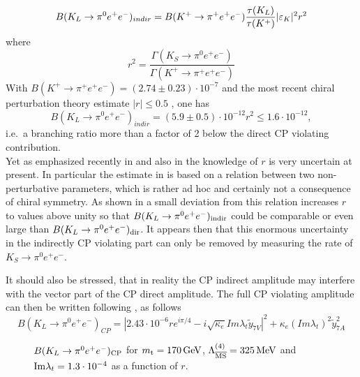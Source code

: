 \begin{equation}
B(K_L \to \pi^0 e^+ e^-)_{indir}=B(K^+ \to \pi^+e^+e^-)
\frac{\tau(K_L)}{\tau(K^+)} |\varepsilon_K|^2 r^2
\label{eq:BKLindir1}
\end{equation}
where
\begin{equation}
r^2=\frac{\Gamma(K_S \to \pi^0 e^+ e^-)}{\Gamma(K^+ \to \pi^+ e^+ e^-)}
\label{eq:r2}
\end{equation}
With $B(K^+ \to \pi^+e^+e^-)=(2.74\pm 0.23)\cdot 10^{-7}$
\cite{alliegro:92} and the most recent chiral perturbation theory
estimate $|r| \le 0.5 $ \cite{eckeretal:88}, \cite{brunoprades:93}
one has
\begin{equation}
B(K_L \to \pi^0 e^+ e^-)_{indir}=(5.9\pm 0.5)\cdot 10^{-12} r^2
 \le 1.6\cdot 10^{-12},
\label{eq:BKLindir2}
\end{equation}
i.e.\ a branching ratio more than a factor of 2 below the direct CP
violating contribution. \\
Yet as emphasized recently in \cite{donoghuegabbiani:95} and also in
\cite{heiligerseghal:93} the knowledge of $r$ is very uncertain at
present. In particular the estimate in  is based on
a relation between two non-perturbative parameters, which is rather
ad hoc and certainly not a consequence of chiral symmetry. As shown
in \cite{donoghuegabbiani:95} a small deviation from this relation
increases $r$ to values above unity so that $B(K_L \to \pi^0
e^+e^-)_{\rm indir}$ could be comparable or even large than 
$B(K_L \to \pi^0 e^+e^-)_{\rm dir}$. It appears then that this
enormous uncertainty in the indirectly CP violating part can only be 
removed by measuring the rate of $K_S \to \pi^0 e^+e^-$.

It should also be stressed, that in reality the CP indirect amplitude
may interfere with the vector part of the CP direct amplitude.  The
full CP violating amplitude can then be written following
\cite{dib1:89}, \cite{dib2:89} as follows
\begin{equation}
B(K_L \to \pi^0 e^+ e^-)_{CP}=| 2.43\cdot 10^{-6} r e^{i\pi/4}-
i\sqrt{\kappa_e} Im\lambda_t\tilde y_{7V}|^2+
\kappa_e (Im\lambda_t)^2\tilde y_{7A}^2
\label{eq:BKLCP}
\end{equation}

\begin{figure}[hbt]
\vspace{0.10in}
\centerline{
\epsfysize=4in
}
\vspace{0.10in}
\caption[]{
$B(K_L \to \pi^0 e^+e^-)_{\rm CP}$ for $m_{\rm t}=170\, {\rm GeV}$,
$\Lambda_{\overline{\rm MS}}^{(4)}=325\, {\rm MeV}$ and ${\rm Im}\lambda_t = 1.3 \cdot 10^{-4}$ as
a function of $r$.
\label{fig:BKLCP}}
\end{figure}

